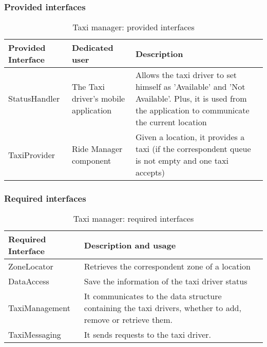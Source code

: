 \subsubsection{Provided interfaces}
\begin{table}[H]
	\begin{longtable}{| p{} | p{} | p{} |}
		\hline
		\textbf{Provided Interface} & \textbf{Dedicated user} & \textbf{Description} \\ \hline
		StatusHandler & The Taxi driver's mobile application & Allows the taxi driver to set himself as 'Available' and 'Not Available'. Plus, it is used from the application to communicate the current location \\ \hline
		TaxiProvider & Ride Manager component & Given a location, it provides a taxi (if the correspondent queue is not empty and one taxi accepts) \\ \hline
	\end{longtable}
	\caption{Taxi manager: provided interfaces}
	\label{tab:taximanager:providedInterfaces}
\end{table}
\subsubsection{Required interfaces}
\begin{table}[H]
	\begin{longtable}{| l | p{} |}
		\hline
		\textbf{Required Interface} & \textbf{Description and usage} \\ \hline
		ZoneLocator & Retrieves the correspondent zone of a location \\ \hline
		DataAccess & Save the information of the taxi driver status \\ \hline
		TaxiManagement & It communicates to the data structure containing the taxi drivers, whether to add, remove or retrieve them. \\ \hline
		TaxiMessaging & It sends requests to the taxi driver. \\ \hline
	\end{longtable}
	\caption{Taxi manager: required interfaces}
	\label{tab:taximanager:requiredInterfaces}
\end{table}
